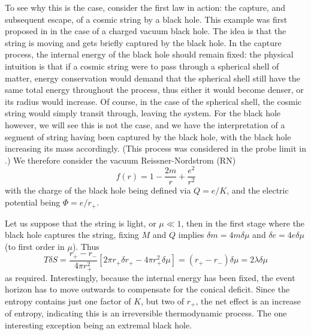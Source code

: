 \documentclass[
twoside,openright,frontopenright]{dmathesis}
\begin{document}
To see why this is the case, consider the first law in action: the 
capture, and subsequent escape, of a cosmic string by a black hole. 
This example was first proposed in \cite{Bonjour:1998rf} in the
case of a charged vacuum black hole. 
The idea is that the string is moving and gets briefly captured by
the black hole. In the capture process, the internal energy of the black
hole should remain fixed: the physical intuition is that if a cosmic string
were to pass through a spherical shell of matter, energy conservation 
would demand that the spherical shell still have the same total energy
throughout the process,
thus either it would become denser, or its radius would increase.
Of course, in the case of the spherical shell, the cosmic string would simply
transit through, leaving the system. For the black hole however, we will
see this is not the case, and we have the interpretation of a segment of 
string having been captured by the black hole, with the black hole increasing
its mass accordingly. (This process was considered in the probe
limit in \cite{Lonsdale:1988xd,DeVilliers:1997nk}.)
We therefore consider the vacuum Reissner-Nordstrom (RN)
\begin{equation}
f(r) = 1  - \frac{2m}{r} + \frac{e^2}{r^2}
\end{equation}
with the charge of the black hole being defined via
$Q = e/K$, and the electric potential being
$\Phi = e/r_+$.

Let us suppose that the string is light, or $\mu \ll 1$, then in the first 
stage where the black hole captures the string, fixing $M$
and $Q$ implies $\delta m = 4 m \delta \mu$ and $\delta e = 4e\delta \mu$
(to first order in $\mu$). Thus
\begin{equation}
T \delta S = \frac{r_+-r_-}{4\pi r_+^2} \left [
2\pi r_+ \delta r_+ - 4\pi r_+^2 \delta\mu \right ]
= (r_+-r_-) \delta \mu = 2\lambda \delta \mu
\end{equation}
as required. Interestingly, because the internal energy has been fixed,
the event horizon has to move outwards to compensate for the conical 
deficit. Since the entropy contains just one factor of $K$, but two of $r_+$,
the net effect is an increase of entropy, indicating this is an irreversible
thermodynamic process. The one interesting exception being an extremal black
hole.
\end{document}
